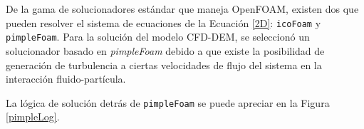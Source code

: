\noindent
\justify

De la gama de solucionadores est\'andar que maneja OpenFOAM, existen dos que pueden resolver el sistema de ecuaciones de la Ecuaci\'on \ref{2D}: \texttt{icoFoam} y \texttt{pimpleFoam}. Para la soluci\'on del modelo CFD-DEM, se seleccion\'o un solucionador basado en \textit{pimpleFoam} debido a que existe la posibilidad de generaci\'on de turbulencia a ciertas velocidades de flujo del sistema en la interacci\'on fluido-part\'icula.

\noindent
\justify

La l\'ogica de soluci\'on detr\'as de \texttt{pimpleFoam} se puede apreciar en la Figura \ref{pimpleLog}.



